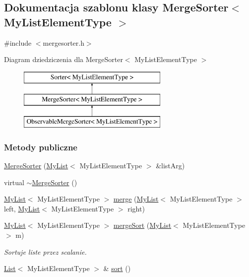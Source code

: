\hypertarget{class_merge_sorter}{\subsection{Dokumentacja szablonu klasy Merge\-Sorter$<$ My\-List\-Element\-Type $>$}
\label{class_merge_sorter}
}


{\ttfamily \#include $<$mergesorter.\-h$>$}

Diagram dziedziczenia dla Merge\-Sorter$<$ My\-List\-Element\-Type $>$\begin{figure}[H]
\begin{center}
\leavevmode
\includegraphics[height=3.000000cm]{class_merge_sorter}
\end{center}
\end{figure}
\subsubsection*{Metody publiczne}
\begin{DoxyCompactItemize}
\item 
\hyperlink{class_merge_sorter_a0ffb06429d7ebcb8bd007ca5db53429f}{Merge\-Sorter} (\hyperlink{class_my_list}{My\-List}$<$ My\-List\-Element\-Type $>$ \&list\-Arg)
\item 
virtual \hyperlink{class_merge_sorter_aa3e8fe75440511195aaf6dd7ef9dfcf1}{$\sim$\-Merge\-Sorter} ()
\item 
\hyperlink{class_my_list}{My\-List}$<$ My\-List\-Element\-Type $>$ \hyperlink{class_merge_sorter_a9cde12ce9803e379ab421bf377103ba0}{merge} (\hyperlink{class_my_list}{My\-List}$<$ My\-List\-Element\-Type $>$ left, \hyperlink{class_my_list}{My\-List}$<$ My\-List\-Element\-Type $>$ right)
\item 
\hyperlink{class_my_list}{My\-List}$<$ My\-List\-Element\-Type $>$ \hyperlink{class_merge_sorter_ab945fd9934a6f47a851b40b23d18ee71}{merge\-Sort} (\hyperlink{class_my_list}{My\-List}$<$ My\-List\-Element\-Type $>$ m)
\begin{DoxyCompactList}\small\item\em Sortuje liste przez scalanie. \end{DoxyCompactList}\item 
\hyperlink{class_list}{List}$<$ My\-List\-Element\-Type $>$ \& \hyperlink{class_merge_sorter_aaee4333eb37af6401eca60da3398e507}{sort} ()
\end{DoxyCompactItemize}

